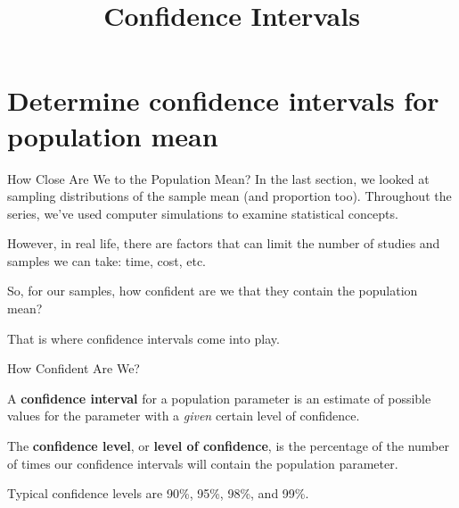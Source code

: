 \documentclass[t]{beamer}
\title{Confidence Intervals}
\author{}
\date{}
\begin{document}

\begin{frame} 
\maketitle
\end{frame}

\section{Determine confidence intervals for population mean}

\begin{frame}{How Close Are We to the Population Mean?}
In the last section, we looked at sampling distributions of the sample mean (and proportion too). Throughout the series, we've used computer simulations to examine statistical concepts. \newline\\	\pause

However, in real life, there are factors that can limit the number of studies and samples we can take: time, cost, etc. \newline\\	\pause

So, for our samples, how confident are we that they contain the population mean?	\newline\\	\pause

That is where confidence intervals come into play.
\end{frame}

\begin{frame}{How Confident Are We?}
\begin{tcolorbox}[colframe=green!20!black, colback = green!30!white,title=\textbf{Confidence Interval}]
A \textbf{confidence interval} for a population parameter is an estimate of possible values for the parameter with a \emph{given} certain level of confidence.
\end{tcolorbox}
\bigskip \pause

\begin{tcolorbox}[colframe=green!20!black, colback = green!30!white,title=\textbf{Confidence Level}]
The \textbf{confidence level}, or \textbf{level of confidence}, is the percentage of the number of times our confidence intervals will contain the population parameter.
\end{tcolorbox}
\bigskip \pause

Typical confidence levels are 90\%, 95\%, 98\%, and 99\%.
\end{frame}
\end{document}
